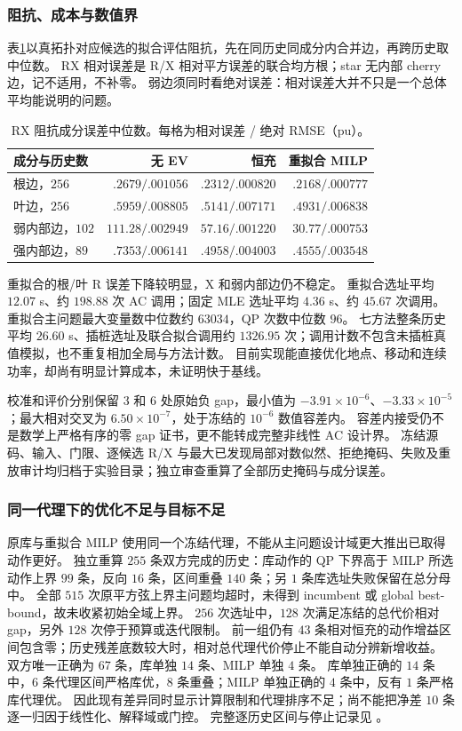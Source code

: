 \documentclass[UTF8,fontset=fandol,11pt,a4paper]{ctexart}
\begin{document}
\subsubsection{阻抗、成本与数值界}
表\ref{tab:adapt-C-impedance}以真拓扑对应候选的拟合评估阻抗，先在同历史同成分内合并边，再跨历史取中位数。
RX 相对误差是 R/X 相对平方误差的联合均方根；star 无内部 cherry 边，记不适用，不补零。
弱边须同时看绝对误差：相对误差大并不只是一个总体平均能说明的问题。
\begin{table}[htbp]
\centering\small
\caption{RX 阻抗成分误差中位数。每格为相对误差 / 绝对 RMSE（pu）。}\label{tab:adapt-C-impedance}
\begin{tabular}{lrrr}\toprule
成分与历史数 & 无 EV & 恒充 & 重拟合 MILP\\\midrule
根边，$256$ & $.2679/.001056$ & $.2312/.000820$ & $.2168/.000777$\\
叶边，$256$ & $.5959/.008805$ & $.5141/.007171$ & $.4931/.006838$\\
弱内部边，$102$ & $111.28/.002949$ & $57.16/.001220$ & $30.77/.000753$\\
强内部边，$89$ & $.7353/.006141$ & $.4958/.004003$ & $.4555/.003548$\\\bottomrule
\end{tabular}
\end{table}
重拟合的根/叶 R 误差下降较明显，X 和弱内部边仍不稳定。
重拟合选址平均 $12.07$ s、约 $198.88$ 次 AC 调用；固定 MLE 选址平均 $4.36$ s、约 $45.67$ 次调用。
重拟合主问题最大变量数中位数约 $63034$，QP 次数中位数 $96$。
七方法整条历史平均 $26.60$ s、插桩选址及联合拟合调用约 $1326.95$ 次；调用计数不包含未插桩真值模拟，也不重复相加全局与方法计数。
目前实现能直接优化地点、移动和连续功率，却尚有明显计算成本，未证明快于基线。

校准和评价分别保留 $3$ 和 $6$ 处原始负 gap，最小值为 $-3.91\times10^{-6}$、$-3.33\times10^{-5}$；最大相对交叉为 $6.50\times10^{-7}$，处于冻结的 $10^{-6}$ 数值容差内。
容差内接受仍不是数学上严格有序的零 gap 证书，更不能转成完整非线性 AC 设计界。
冻结源码、输入、门限、逐候选 R/X 与最大已发现局部对数似然、拒绝掩码、失败及重放审计均归档于实验目录；独立审查重算了全部历史掩码与成分误差。

\subsubsection{同一代理下的优化不足与目标不足}
原库与重拟合 MILP 使用同一个冻结代理，不能从主问题设计域更大推出已取得动作更好。
独立重算 $255$ 条双方完成的历史：库动作的 QP 下界高于 MILP 所选动作上界 $99$ 条，反向 $16$ 条，区间重叠 $140$ 条；另 $1$ 条库选址失败保留在总分母中。
全部 $515$ 次原平方弦上界主问题均超时，未得到 incumbent 或 global best-bound，故未收紧初始全域上界。
$256$ 次选址中，$128$ 次满足冻结的总代价相对 gap，另外 $128$ 次停于预算或迭代限制。
前一组仍有 $43$ 条相对恒充的动作增益区间包含零；历史残差底数较大时，相对总代理代价停止不能自动分辨新增收益。
双方唯一正确为 $67$ 条，库单独 $14$ 条、MILP 单独 $4$ 条。
库单独正确的 $14$ 条中，$6$ 条代理区间严格库优，$8$ 条重叠；MILP 单独正确的 $4$ 条中，反有 $1$ 条严格库代理优。
因此现有差异同时显示计算限制和代理排序不足；尚不能把净差 $10$ 条逐一归因于线性化、解释域或门控。
完整逐历史区间与停止记录见 。
\end{document}
